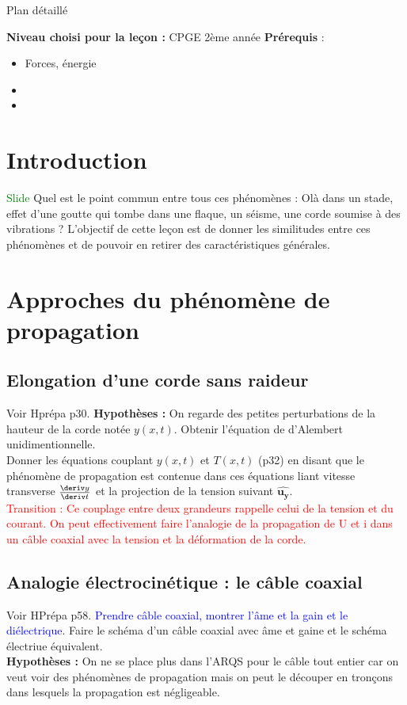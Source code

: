 \begin{reportBlock}{Plan détaillé}

  \textbf{Niveau choisi pour la leçon :} CPGE 2ème année
  \newline
  \textbf{Prérequis} : \begin{itemize}
      \item Forces, énergie
      \item 
      \item 
  \end{itemize}
  
  \section*{Introduction}
\textcolor{green}{Slide} Quel est le point commun entre tous ces phénomènes : Olà dans un stade, effet d'une goutte qui tombe dans une flaque, un séisme, une corde soumise à des vibrations ? L'objectif de cette leçon est de donner les similitudes entre ces phénomènes et de pouvoir en retirer des caractéristiques générales.

  \section{Approches du phénomène de propagation}

  \subsection{Elongation d'une corde sans raideur}
  Voir Hprépa p30.
  \textbf{Hypothèses :} On regarde des petites perturbations de la hauteur de la corde notée $y(x,t)$. 
  Obtenir l'équation de d'Alembert unidimentionnelle.\\
  
  Donner les équations couplant $y(x,t)$ et $T(x,t)$ (p32) en disant que le phénomène de propagation est contenue dans ces équations liant vitesse transverse $\fracD{y}{t}$ et la projection de la tension suivant $\mathbf{\hat{u_y}}$.\\

  \textcolor{red}{Transition : Ce couplage entre deux grandeurs rappelle celui de la tension et du courant. On peut effectivement faire l'analogie de la propagation de U et i dans un câble coaxial avec la tension et la déformation de la corde.}

  \subsection{Analogie électrocinétique : le câble coaxial} 
  Voir HPrépa p58. \textcolor{blue}{Prendre câble coaxial, montrer l'âme et la gain et le diélectrique}. Faire le schéma d'un câble coaxial avec âme et gaine et le schéma électriue équivalent.\\
  \textbf{Hypothèses :} On ne se place plus dans l'ARQS pour le câble tout entier car on veut voir des phénomènes de propagation mais on peut le découper en tronçons dans lesquels la propagation est négligeable. \\
  

\end{reportBlock}
